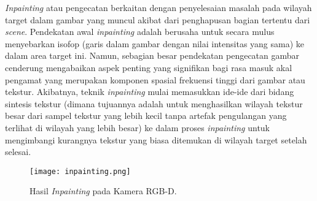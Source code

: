 \textit{Inpainting} atau pengecatan berkaitan dengan penyelesaian masalah pada wilayah target dalam gambar yang muncul akibat dari penghapusan bagian tertentu dari \textit{scene}. Pendekatan awal \textit{inpainting} adalah berusaha untuk secara mulus menyebarkan isofop (garis dalam gambar dengan nilai intensitas yang sama) ke dalam area target ini.
Namun, sebagian besar pendekatan pengecatan gambar cenderung mengabaikan aspek penting yang signifikan bagi rasa masuk akal pengamat yang merupakan komponen spasial frekuensi tinggi dari gambar atau tekstur.
Akibatnya, teknik \textit{inpainting} mulai memasukkan ide-ide dari bidang sintesis tekstur (dimana tujuannya adalah untuk menghasilkan wilayah tekstur besar dari sampel tekstur yang lebih kecil tanpa artefak pengulangan yang terlihat di wilayah yang lebih besar) ke dalam proses \textit{inpainting} untuk mengimbangi kurangnya tekstur yang biasa ditemukan di wilayah target setelah selesai.

    \begin{figure}[H]
        \centering
        \texttt{[image: inpainting.png]}
        \caption{Hasil \textit{Inpainting} pada Kamera RGB-D\cite{b9}.}
        \label{fig:Ch02_inpainting}
    \end{figure}


